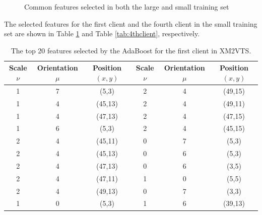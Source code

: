 \begin{figure}[ht]
\begin{center}
 \caption{Common features selected in both the large and small training set }
\label{fig:resultslarge14}
\end{center}
\end{figure}
The selected features for the first client and the fourth client in the small training set are shown in \mbox{Table} \ref{tab:1stclient} and \mbox{Table} \ref{tab:4thclient}, respectively.
\begin{table}[p]
 \caption{The top 20 features selected by the AdaBoost for the first client in XM2VTS.}
\begin{center}
 \centering
  \begin{tabular}{|c|c|c||c|c|c|}\hline
   \small{Scale $\nu$} & \small{Orientation $\mu$} & \small{Position $(x,y)$} & \small{Scale $\nu$} & \small{Orientation $\mu$} & \small{Position $(x,y)$}\\\hline
   1&7&(5,3)&2&4&(49,15)\\\hline
   1&4&(45,13)&2&4&(49,11)\\\hline
   1&4&(47,13)&2&4&(47,15)\\\hline
   1&6&(5,3)&2&4&(45,15)\\\hline
   2&4&(45,11)&0&7&(5,3)\\\hline
   2&4&(45,13)&0&6&(5,3)\\\hline
   2&4&(47,13)&0&6&(3,5)\\\hline
   2&4&(47,11)&1&0&(5,5)\\\hline
   2&4&(49,13)&0&7&(3,3)\\\hline
   1&0&(5,3)&1&6&(39,13)\\\hline
  \end{tabular}
 \label{tab:1stclient}
\end{center}
\end{table}
